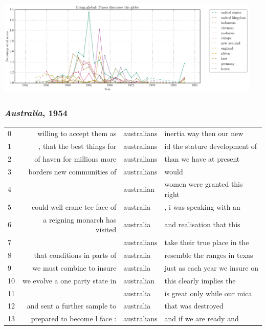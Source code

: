 \documentclass{beamer}       %
\begin{document}
\begin{frame}
    \centering
    \includegraphics[width=0.95\textwidth]{images/going-global-fraser-discusses-the-globe.png}
\end{frame}


\begin{frame}
	\frametitle{\emph{Australia}, 1954}
\begin{table}
\tiny
\begin{tabular}{lrll}
   0 &        willing to accept them as & australians  & inertia way then our new \\
   1 &       , that the best things for & australians  & id the stature development of \\
   2 &       of haven for millions more & australians  & than we have at present \\
   3 &       borders new communities of & australians  & would \\
   4 &                                  & australian   & women were granted this right \\
   5 &     could well crane tee face of & australia    & , i was speaking with an \\
   6 &   a reigning monarch has visited & australia    & and realisation that this \\
   7 &                                  & australians  & take their true place in the \\
   8 &      that conditions in parts of & australia    & resemble the ranges in texas \\
   9 &        we must combine to insure & australia    & just as each year we insure on \\
  10 &   we evolve a one party state in & australian   & this clearly implies the \\
  11 &                                  & australia    & is great only while our mica \\
  12 &     and sent a further sample to & australia    & that was destroyed \\
  13 &      prepared to become l face : & australians  & and if we are ready and \\

\end{tabular}
\end{table}
\end{frame}
\end{document}
